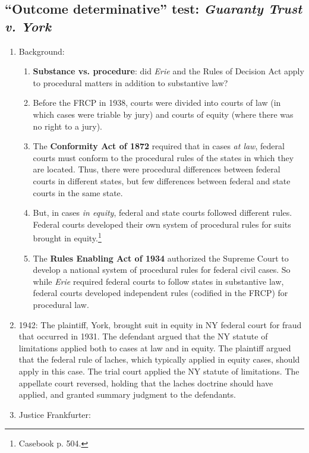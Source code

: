 \subsection{``Outcome determinative'' test: \emph{Guaranty Trust v. York}}

\begin{enumerate}
    \item Background:
    \begin{enumerate}
        \item \textbf{Substance vs. procedure}: did \emph{Erie} and the Rules of Decision Act apply to procedural matters in addition to substantive law?
        \item Before the FRCP in 1938, courts were divided into courts of law (in which cases were triable by jury) and courts of equity (where there was no right to a jury).
        \item The \textbf{Conformity Act of 1872} required that in cases \emph{at law}, federal courts must conform to the procedural rules of the states in which they are located. Thus, there were procedural differences between federal courts in different states, but few differences between federal and state courts in the same state.
        \item But, in cases \emph{in equity}, federal and state courts followed different rules. Federal courts developed their own system of procedural rules for suits brought in equity.\footnote{Casebook p. 504.}
        \item The \textbf{Rules Enabling Act of 1934} authorized the Supreme Court to develop a national system of procedural rules for federal civil cases. So while \emph{Erie} required federal courts to follow states in substantive law, federal courts developed independent rules (codified in the FRCP) for procedural law. 
    \end{enumerate}
    \item 1942: The plaintiff, York, brought suit in equity in NY federal court for fraud that occurred in 1931. The defendant argued that the NY statute of limitations applied both to cases at law and in equity. The plaintiff argued that the federal rule of laches, which typically applied in equity cases, should apply in this case. The trial court applied the NY statute of limitations. The appellate court reversed, holding that the laches doctrine should have applied, and granted summary judgment to the defendants.
    \item Justice Frankfurter:
    \begin{enumerate}

\end{enumerate}
\end{enumerate}
